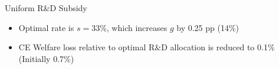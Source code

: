\documentclass[
  aspectratio=169,  %
]{beamer}
\theoremstyle{plain}
\begin{document}
\begin{frame}{Uniform R\&D Subsidy \hyperlink{optimal}{}}
  \begin{center}
    \begin{figure}
      \centering{}\setcounter{subfigure}{0}
    \end{figure}
    \par\end{center}
  \begin{itemize}
    \item Optimal rate is $s=$33\%, which increases $g$ by 0.25 pp (14\%)
    \item CE Welfare loss relative to optimal R\&D allocation is reduced to
          0.1\% (Initially 0.7\%)
  \end{itemize}
\end{frame}
%
\end{document}
